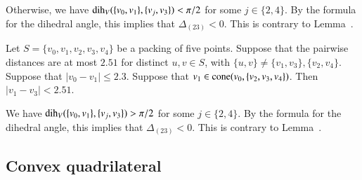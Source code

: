 \begin{tarskidata}
\begin{tarski}
\begin{proved}
Otherwise, we have $\operatorname{dih}_V(\{v_0,v_1\},\{v_j,v_3\}) < \pi/2$ for some $j\in\{2,4\}$.
  By the formula for the dihedral angle, this
implies that $\Delta_{(23)}<0$.  This is contrary to Lemma~.
\swallowed\end{proved}
\end{tarski}







\begin{tarski}

\begin{lemma}
Let $S=\{v_0,v_1,v_2,v_3,v_4\}$ be a packing of
five points.  Suppose that the pairwise
distances are at most $2.51$ for distinct $u,v\in S$, with
$\{u,v\}\ne \{v_1,v_3\}, \{v_2,v_4\}$.  Suppose that $|v_0-v_1|\le 2.3$.
Suppose that $v_1\in{\operatorname{cone}}(v_0,\{v_2,v_3,v_4\})$.
Then $|v_1-v_3|< 2.51$.  
\end{lemma}

\begin{proved}
We have $\operatorname{dih}_V(\{v_0,v_1\},\{v_j,v_3\})>\pi/2$ for some $j\in\{2,4\}$.
  By the formula for the dihedral angle, this
implies that $\Delta_{(23)}<0$.  This is contrary to Lemma~.
\swallowed\end{proved}
\end{tarski}









\begin{tarski}
\section{Convex quadrilateral}


\end{tarski}
\end{tarskidata}
